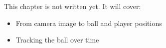 \label{ch:ctl6}
\begin{keyidea}
This chapter is not written yet. It will cover:
\begin{itemize}[nosep]
  \item From camera image to ball and player positions
  \item Tracking the ball over time
\end{itemize}
\end{keyidea}
